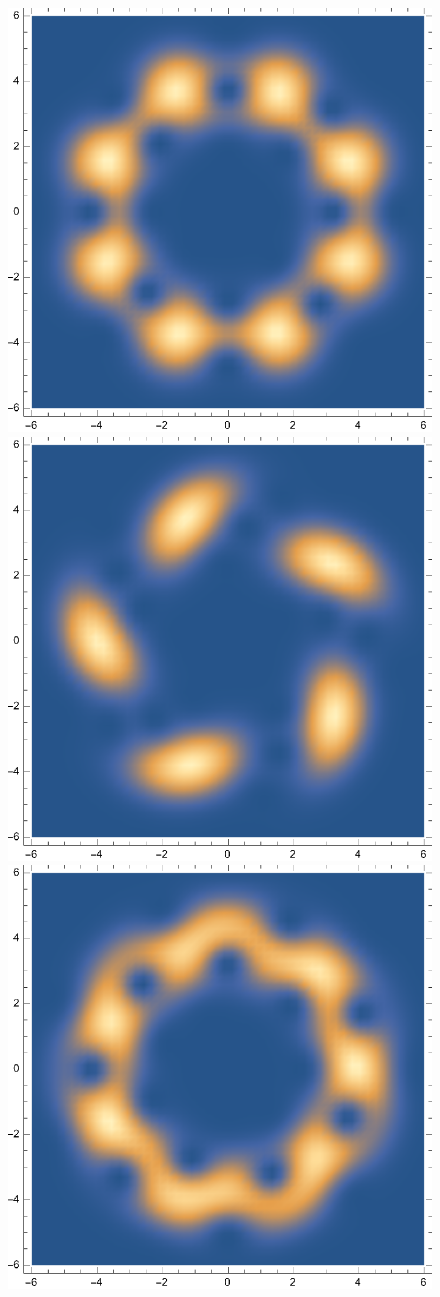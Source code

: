 \documentclass{article}
\theoremstyle{definition}
\begin{document}
\begin{enumerate}[label=\alph*)]
\begin{figure}[!htb]
\begin{minipage}{.24\textwidth}
  	\includegraphics[width=.7\linewidth]{figures/5-48.eps}
	\end{minipage}%
	\begin{minipage}{.24\textwidth}
  	\centering
  	\includegraphics[width=.7\linewidth]{figures/5-52.eps}
	\end{minipage}
	\begin{minipage}{.24\textwidth}
  	\centering
  	\includegraphics[width=.7\linewidth]{figures/5-56.eps}

\end{minipage}
\end{figure}
\end{enumerate}
\end{document}
